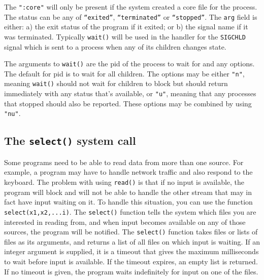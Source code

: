 
The \texttt{":core"} will only be present if
the system created a core file for the process. The status can be any
of \texttt{``exited''},
\texttt{``terminated''} or
\texttt{``stopped''}. The \texttt{arg} field
is either: a) the exit status of the program if it exited; or b) the
signal name if it was terminated. Typically \texttt{wait()} will be
used in the handler for the \texttt{SIGCHLD} signal which is sent to a
process when any of its children changes state.

The arguments to \texttt{wait()} are the pid of the process to wait for
and any options. The default for pid is to wait for all children. The
options may be either \texttt{"n"}, meaning
\texttt{wait()} should not wait for children to block but should return
immediately with any status that's available, or
\texttt{"u"}, meaning that any processes
that stopped should also be reported. These options may be combined by
using \texttt{"nu"}.

\subsection*{The \texttt{select()} system call}

Some programs need to be able to read data from more than one source.
For example, a program may have to handle network traffic and also
respond to the keyboard. The problem with using
\texttt{read()} is that if no input is available, the program will
block and will not be able to handle the other stream that may in fact
have input waiting on it. To handle this situation, you can use the
function \texttt{select(x1,x2,...i)}. The
\texttt{select()} function tells the system which files
you are interested in reading from, and when input becomes available on
any of those sources, the program will be notified. The
\texttt{select()} function takes files or lists of files as its
arguments, and returns a list of all files on which input is waiting.
If an integer argument is supplied, it is a timeout that gives the
maximum milliseconds to wait before input is available. If the timeout
expires, an empty list is returned. If no timeout is given, the program
waits indefinitely for input on one of the files.


